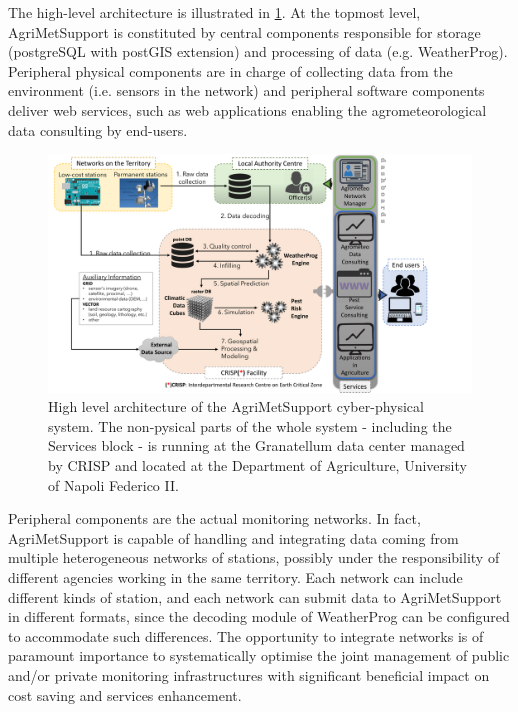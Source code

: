 \documentclass[authoryear,preprint,review,12pt]{elsarticle}
\begin{document}
The high-level architecture is illustrated in \cref{cyberPhysicalSystemFig}.
At the topmost level, AgriMetSupport is constituted by central components responsible for storage (postgreSQL with postGIS extension) and processing of data (e.g. WeatherProg).
Peripheral physical components are in charge of collecting data from the environment (i.e. sensors in the network) and peripheral software components deliver web services, such as web applications enabling the agrometeorological data consulting by end-users.

\begin{figure}
	\centering
	\includegraphics[angle=90,scale=.60]{figures/AgriMetSupport-fig.pdf}
	\caption{High level architecture of the AgriMetSupport cyber-physical system.
             The non-pysical parts of the whole system - including the Services block - is running at the Granatellum data center managed by CRISP and located at the Department of Agriculture,  University of Napoli Federico II.
 }
	\label{cyberPhysicalSystemFig}
\end{figure}

Peripheral components are the actual monitoring networks.
In fact, AgriMetSupport is capable of handling and integrating data coming from multiple heterogeneous networks of stations, possibly under the responsibility of different agencies working in the same territory.
Each network can include different kinds of station, and each network can submit data to AgriMetSupport in different formats, since the decoding module of WeatherProg can be configured to accommodate such differences.
The opportunity to integrate networks is of paramount importance to systematically optimise the joint management of public and/or private monitoring infrastructures with significant beneficial impact on cost saving and services enhancement.
\end{document}

